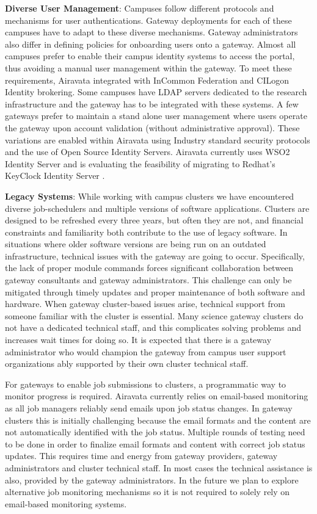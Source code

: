 \documentclass[sigconf]{acmart}
\begin{document}
\noindent\textbf{Diverse User Management}: Campuses follow different protocols and mechanisms for user authentications. Gateway deployments for each of these campuses have to adapt to these diverse mechanisms. Gateway administrators also differ in defining policies for onboarding users onto a gateway.  Almost all campuses prefer to enable their campus identity systems to access the portal, thus avoiding a manual user management within the gateway. To meet these requirements, Airavata integrated with InCommon Federation and CILogon Identity brokering. Some campuses have LDAP servers dedicated to the research infrastructure and the gateway has to be integrated with these systems.  A few gateways prefer to maintain  a stand alone user management where users operate the gateway upon account validation (without administrative approval). These variations are enabled within Airavata using Industry standard security protocols and the use of Open Source Identity Servers. Airavata currently uses WSO2 Identity Server \cite{wso2IS} and is evaluating the feasibility of  migrating to Redhat's KeyClock Identity Server \cite{keycloak}.

\noindent\textbf{Legacy Systems}: While working with campus clusters we have encountered diverse job-schedulers and multiple versions of software applications. Clusters are designed to be refreshed every three years, but often they are not, and financial constraints and familiarity both contribute to the use of legacy software. In situations where older software versions are being run on an outdated infrastructure, technical issues with the gateway are going to occur.  Specifically, the lack of proper module commands forces significant collaboration between gateway consultants and gateway administrators. This challenge can only be mitigated through timely updates and proper maintenance of both software and hardware.  When gateway cluster-based issues arise,  technical support from someone familiar with the cluster is essential. Many science gateway clusters do not have a dedicated technical staff, and this complicates solving problems and increases wait times for doing so. It is expected that there is a gateway administrator who would champion the gateway from campus user support organizations ably supported by their own cluster technical staff.

For gateways to enable job submissions to clusters, a programmatic way to monitor progress is required. Airavata currently relies on email-based monitoring as all job managers reliably send emails upon job status changes. In gateway clusters this is initially challenging because the email formats and the content are not automatically identified with the job status. Multiple rounds of testing need to be done in order to finalize email formats and content with correct job status updates. This requires time and energy from gateway providers, gateway administrators and cluster technical staff. In most cases the technical assistance is also, provided by the gateway administrators. In the future we plan to explore alternative job monitoring mechanisms so it is  not required to solely rely on email-based monitoring systems.
\end{document}
